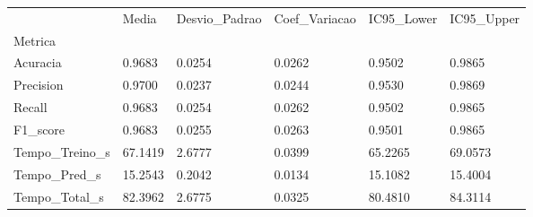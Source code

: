 \begin{tabular}{llllll}
\toprule
 & Media & Desvio_Padrao & Coef_Variacao & IC95_Lower & IC95_Upper \\
Metrica &  &  &  &  &  \\
\midrule
Acuracia & 0.9683 & 0.0254 & 0.0262 & 0.9502 & 0.9865 \\
Precision & 0.9700 & 0.0237 & 0.0244 & 0.9530 & 0.9869 \\
Recall & 0.9683 & 0.0254 & 0.0262 & 0.9502 & 0.9865 \\
F1_score & 0.9683 & 0.0255 & 0.0263 & 0.9501 & 0.9865 \\
Tempo_Treino_s & 67.1419 & 2.6777 & 0.0399 & 65.2265 & 69.0573 \\
Tempo_Pred_s & 15.2543 & 0.2042 & 0.0134 & 15.1082 & 15.4004 \\
Tempo_Total_s & 82.3962 & 2.6775 & 0.0325 & 80.4810 & 84.3114 \\
\bottomrule
\end{tabular}
